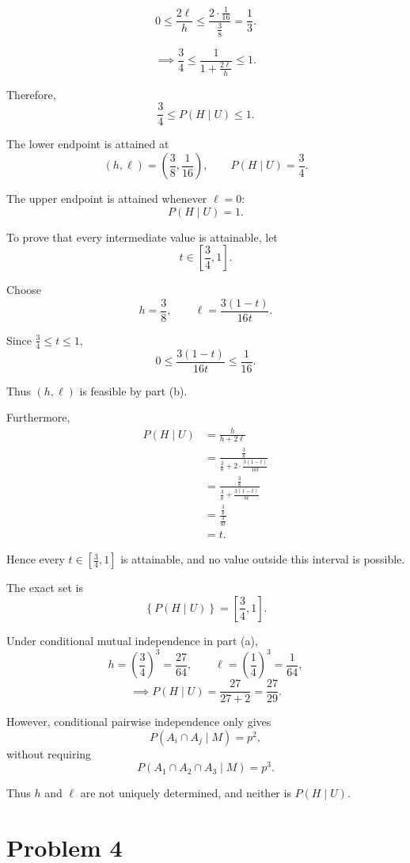 \documentclass[11pt,a4paper]{article}
\newcommand{\Prob}{P}
\begin{document}
\begin{enumerate}
\[
0\le\frac{2\ell}{h}
\le\frac{2\cdot\frac1{16}}{\frac38}
=\frac13.
\]

\[
\implies
\frac34\le\frac1{1+\frac{2\ell}{h}}\le1.
\]

Therefore,
\[
\frac34\le\Prob(H\mid U)\le1.
\]

The lower endpoint is attained at
\[
(h,\ell)=\left(\frac38,\frac1{16}\right),
\qquad
\Prob(H\mid U)=\frac34.
\]

The upper endpoint is attained whenever $\ell=0$:
\[
\Prob(H\mid U)=1.
\]

To prove that every intermediate value is attainable,
let
\[
t\in\left[\frac34,1\right].
\]

Choose
\[
h=\frac38,\qquad
\ell=\frac{3(1-t)}{16t}.
\]

Since $\frac34\le t\le1$,
\[
0\le\frac{3(1-t)}{16t}\le\frac1{16}.
\]

Thus $(h,\ell)$ is feasible by part (b).

Furthermore,
\[
\begin{aligned}
\Prob(H\mid U)
&=\frac{h}{h+2\ell}\\
&=\frac{\frac38}
{\frac38+2\cdot\frac{3(1-t)}{16t}}\\
&=\frac{\frac38}
{\frac38+\frac{3(1-t)}{8t}}\\
&=\frac{\frac38}{\frac{3}{8t}}\\
&=t.
\end{aligned}
\]

Hence every $t\in[\frac34,1]$ is attainable,
and no value outside this interval is possible.

The exact set is
\[
\left\{\Prob(H\mid U)\right\}
=\left[\frac34,1\right].
\]

Under conditional mutual independence in part (a),
\[
h=\left(\frac34\right)^3=\frac{27}{64},
\qquad
\ell=\left(\frac14\right)^3=\frac1{64},
\]
\[
\implies
\Prob(H\mid U)
=\frac{27}{27+2}
=\frac{27}{29}.
\]

However, conditional pairwise independence only gives
\[
\Prob(A_i\cap A_j\mid M)=p^2,
\]
without requiring
\[
\Prob(A_1\cap A_2\cap A_3\mid M)=p^3.
\]

Thus $h$ and $\ell$ are not uniquely determined,
and neither is $\Prob(H\mid U)$.

\end{enumerate}




\clearpage
\section*{Problem 4}
\end{document}
